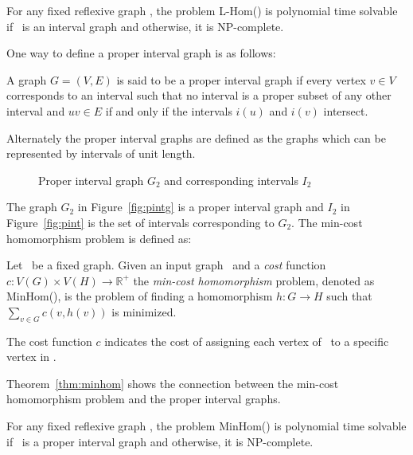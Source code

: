\begin{theorem}  \label{thm:lhom}
For any fixed reflexive graph \mH, the problem L-Hom(\mH) is polynomial time solvable if
\mH\ is an interval graph and otherwise, it is NP-complete.
\end{theorem}

One way to define a proper interval graph is as follows:

\begin{defi}
A graph \(G=(V,E)\) is said to be a proper interval graph if every vertex \(v \in V\)
corresponds to an interval such that no interval is a proper subset of any other interval
and \(uv \in E\) if and only if the intervals \(i(u)\) and \(i(v)\) intersect.
\end{defi}

Alternately the proper interval graphs are defined as the graphs which can be represented 
by intervals of unit length.

\begin{figure}[h]
\hfill
\subfigure[\ensuremath{G_2}]{\label{fig:pintg}}\hfill 
\subfigure[\ensuremath{I_2}]{\label{fig:pint}}\hfill 
\caption{Proper interval graph \ensuremath{G_2} and corresponding intervals
\ensuremath{I_2}}\label{fig:pintgi}
\end{figure}

The graph \(G_2\) in Figure~\ref{fig:pintg} is a proper interval graph and
\(I_2\) in Figure~\ref{fig:pint} is the set of intervals corresponding to \(G_2\)\@.
The min-cost homomorphism problem is defined as:

\begin{defi} [MinHom]
Let \mH\ be a fixed graph. Given an input graph \mG\ and a \emph{cost} function
\(c: V(G) \times V(H) \to \mathbb{R}^+\) the \emph{min-cost homomorphism} problem,
denoted as MinHom(\mH), is the problem of finding a homomorphism 
\(h:G\to H\) such that \(\sum_{v\in G} c(v, h(v))\) is minimized.
\end{defi}

The cost function \(c\) indicates the cost of assigning each vertex of \mG\ 
to a specific vertex in \mH\@. 

Theorem~\ref{thm:minhom} shows the connection between the min-cost homomorphism problem 
and the proper interval graphs.

\begin{theorem} [TODO] \label{thm:minhom}
For any fixed reflexive graph \mH, the problem MinHom(\mH) is polynomial time solvable if
\mH\ is a proper interval graph and otherwise, it is NP-complete.
\end{theorem}

